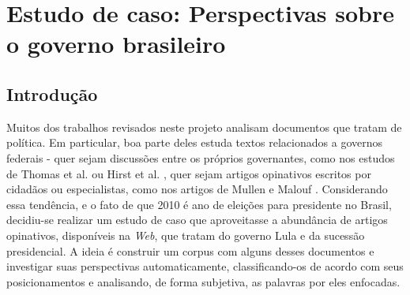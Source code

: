 \chapter{Estudo de caso: Perspectivas sobre o governo brasileiro}

\section{Introdução}




Muitos dos trabalhos revisados neste projeto analisam documentos que tratam de política. Em particular, boa parte deles estuda textos relacionados a governos federais - quer sejam discussões entre os próprios governantes, como nos estudos de Thomas et al. \cite{get-out-the-vote} ou Hirst et al. \cite{hirst-et-al}, quer sejam artigos opinativos escritos por cidadãos ou especialistas, como nos artigos de Mullen e Malouf \cite{aaai-politics} \cite{malouf-taking_sides}. Considerando essa tendência, e o fato de que 2010 é ano de eleições para presidente no Brasil, decidiu-se realizar um estudo de caso que aproveitasse a abundância de artigos opinativos, disponíveis na \emph{Web}, que tratam do governo Lula e da sucessão presidencial. A ideia é construir um corpus com alguns desses documentos e investigar suas perspectivas automaticamente, classificando-os de acordo com seus posicionamentos e analisando, de forma subjetiva, as palavras por eles enfocadas.

